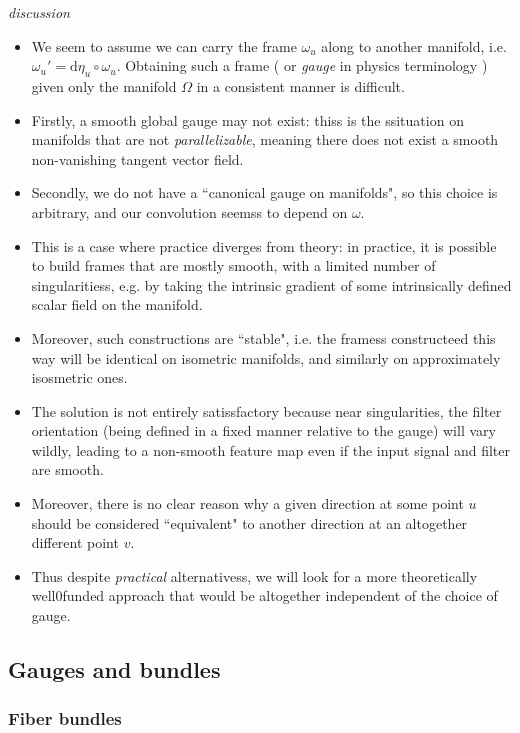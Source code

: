 \documentclass[12pt]{article}
\numberwithin{equation}{section}
\theoremstyle{definition}
\newcommand{		\n		}	{	\noindent					} %
\newcommand{		\Oh		}	{	\Omega					}
\newcommand{		\1		}	{	\bm{1}					}%
\begin{document}
\n \hrulefill
\emph{ discussion }
\hrulefill

\begin{itemize}
\item We seem to assume we can carry the frame $\omega_u$ along to another manifold, i.e. $\omega_u' = \textrm{d} \eta_u \circ \omega_u$.  Obtaining such a frame ( or \emph{gauge} in physics terminology ) given only the manifold $\Oh$ in a consistent manner is difficult.
\item Firstly, a smooth global gauge may not exist: thiss is the ssituation on manifolds that are not \emph{parallelizable}, meaning there does not exist a smooth non-vanishing tangent vector field.
\item Secondly, we do not have a ``canonical gauge on manifolds", so this choice is arbitrary, and our convolution seemss to depend on $\omega$. 
\item This is a case where practice diverges from theory: in practice, it is possible to build frames that are mostly smooth, with a limited number of singularitiess, e.g. by taking the intrinsic gradient of some intrinsically defined scalar field on the manifold. 
\item Moreover, such constructions are ``stable", i.e. the framess constructeed this way will be identical on isometric manifolds, and similarly on approximately isosmetric ones.
\item The solution is not entirely satissfactory because near singularities, the filter orientation (being defined in a fixed manner relative to the gauge) will vary wildly, leading to a non-smooth feature map even if the input signal and filter are smooth. 
\item Moreover, there is no clear reason why a given direction at some point $u$ should be considered ``equivalent" to another direction at an altogether different point $v$. 
\item Thus despite \emph{practical} alternativess, we will look for a more theoretically well0funded approach that would be altogether independent of the choice of gauge. 
\end{itemize}

\subsection{Gauges and bundles}

\subsubsection*{Fiber bundles}
\end{document}
